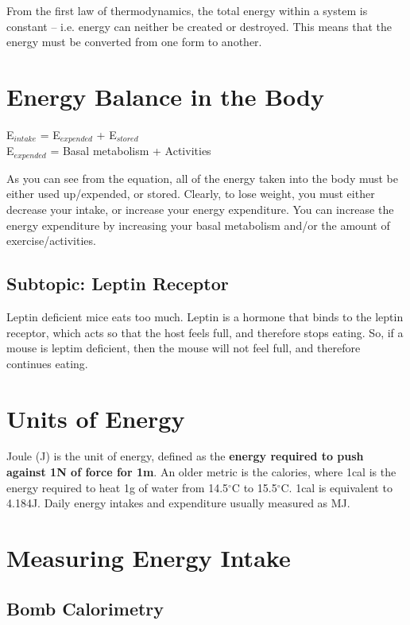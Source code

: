 \documentclass[a4paper, 12pt]{report}
\begin{document}
From the first law of thermodynamics, the total energy within a system is constant -- i.e. energy can neither be created or destroyed.
This means that the energy must be converted from one form to another.

\section{Energy Balance in the Body}

\begin{center}
E$_{intake}$ = E$_{expended}$ + E$_{stored}$\\
\vspace{0.5cm}
E$_{expended}$ = Basal metabolism + Activities
\end{center}

As you can see from the equation, all of the energy taken into the body must be either used up/expended, or stored.
Clearly, to lose weight, you must either decrease your intake, or increase your energy expenditure.
You can increase the energy expenditure by increasing your basal metabolism and/or the amount of exercise/activities.

\subsection{Subtopic: Leptin Receptor}

Leptin deficient mice eats too much.
Leptin is a hormone that binds to the leptin receptor, which acts so that the host feels full, and therefore stops eating.
So, if a mouse is leptim deficient, then the mouse will not feel full, and therefore continues eating.

\section{Units of Energy}

Joule (J) is the unit of energy, defined as the \textbf{energy required to push against 1N of force for 1m}.
An older metric is the calories, where 1cal is the energy required to heat 1g of water from 14.5$^\circ$C to 15.5$^\circ$C.
1cal is equivalent to 4.184J.
Daily energy intakes and expenditure usually measured as MJ.

\section{Measuring Energy Intake}

\subsection{Bomb Calorimetry}
\end{document}

